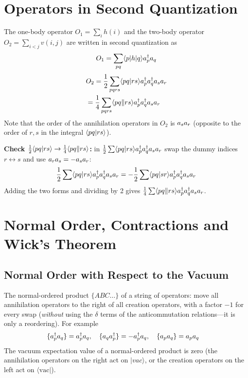 \section{Operators in Second Quantization}

The one-body operator $O_1 = \sum_i h(i)$ and the two-body operator $O_2 = \sum_{i<j} v(i,j)$ are written in second quantization as
\begin{align*}
O_1 = \sum_{pq} \langle p|h|q\rangle a^{\dagger}_{p} a_q
\end{align*}
\begin{align}\label{eq:op2}
&O_2 = \frac{1}{2} \sum_{pqrs} \langle pq\vert rs\rangle a^{\dagger}_{p} a^{\dagger}_{q} a_s a_r \\
&= \frac{1}{4} \sum_{pqrs} \langle pq\Vert rs\rangle a^{\dagger}_{p} a^{\dagger}_{q} a_s a_r \notag
\end{align}
Note that the order of the annihilation operators in $O_2$ is $a_{s} a_{r}$ (opposite to the order of $r, s$ in the integral $\langle pq\vert rs\rangle$).

\textbf{Check $\frac{1}{2} \langle pq\vert rs\rangle \rightarrow \frac{1}{4} \langle pq\Vert rs\rangle$:} in $\frac{1}{2} \sum \langle pq\vert rs\rangle a^{\dagger}_{p} a^{\dagger}_{q} a_{s} a_{r}$ swap the dummy indices $r \leftrightarrow s$ and use $a_{r} a_{s} = - a_{s} a_{r}$:
\begin{align*}
\frac{1}{2} \sum \langle pq\vert rs\rangle a^{\dagger}_{p} a^{\dagger}_{q} a_s a_r = - \frac{1}{2} \sum \langle pq\vert sr\rangle a^{\dagger}_{p} a^{\dagger}_{q} a_s a_r
\end{align*}
Adding the two forms and dividing by 2 gives $\frac{1}{4} \sum \langle pq\Vert rs\rangle a^{\dagger}_{p} a^{\dagger}_{q} a_{s} a_{r}$.

\section{Normal Order, Contractions and Wick's Theorem}

\subsection{Normal Order with Respect to the Vacuum}

The normal-ordered product $\{ABC\dots\}$ of a string of operators: move all annihilation operators to the right of all creation operators, with a factor $-1$ for every swap (\emph{without} using the $\delta$ terms of the anticommutation relations---it is only a reordering). For example
\begin{align*}
\{a^{\dagger}_{p} a_q\} &= a^{\dagger}_{p} a_q, \quad \{a_q a^{\dagger}_{p}\} = - a^{\dagger}_{p} a_q, \quad \{a_p a_q\} = a_p a_q
\end{align*}
The vacuum expectation value of a normal-ordered product is zero (the annihilation operators on the right act on $|vac\rangle$, or the creation operators on the left act on $\langle \text{vac}|$).

